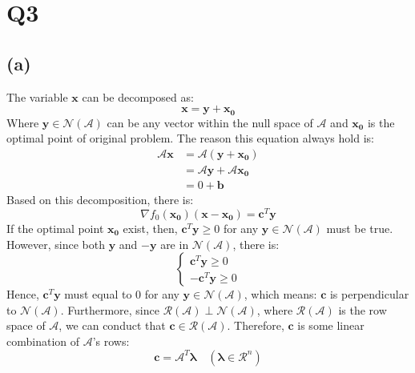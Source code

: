 \documentclass[10pt,a4paper]{article}
\begin{document}
\section*{Q3}

\subsection*{(a)}
The variable $\mathbf{x}$ can be decomposed as:
\begin{equation*}
	\mathbf{x} = \mathbf{y} + \mathbf{x_{0}}
\end{equation*} 
Where $\mathbf{y} \in \mathcal{N}(\mathcal{A})$ can be any vector within the null space of $\mathcal{A}$ and $\mathbf{x_{0}}$ is the optimal point of original problem. The reason this equation always hold is:
\begin{equation}
	\begin{aligned}
		\mathcal{A}\mathbf{x} &= \mathcal{A}(\mathbf{y} + \mathbf{x_{0}}) \\
		&= \mathcal{A}\mathbf{y} + \mathcal{A}\mathbf{x_{0}} \\
		&= 0 + \mathbf{b}
	\end{aligned}
\end{equation}
Based on this decomposition, there is:
\begin{equation}
	\nabla f_{0}(\mathbf{x_{0}})(\mathbf{x} - \mathbf{x_{0}}) = \mathbf{c}^{T}\mathbf{y}
\end{equation}
If the optimal point $\mathbf{x_{0}}$ exist, then, $\mathbf{c}^{T} \mathbf{y} \geq 0$ for any $\mathbf{y} \in \mathcal{N}(\mathcal{A})$ must be true. However, since both $\mathbf{y}$ and $-\mathbf{y}$ are in $\mathcal{N}(\mathcal{A})$, there is:
\begin{equation}
	\begin{cases}
		\mathbf{c}^{T} \mathbf{y} \geq 0 \\
		-\mathbf{c}^{T} \mathbf{y} \geq 0
	\end{cases}
\end{equation}
Hence, $\mathbf{c}^{T} \mathbf{y}$ must equal to 0 for any $\mathbf{y} \in \mathcal{N}(\mathcal{A})$, which means: $\mathbf{c}$ is perpendicular to $\mathcal{N}(\mathcal{A})$. Furthermore, since $\mathcal{R}(\mathcal{A}) \perp \mathcal{N}(\mathcal{A})$, where $\mathcal{R}(\mathcal{A})$ is the row space of $\mathcal{A}$, we can conduct that $\mathbf{c} \in \mathcal{R}(\mathcal{A})$. Therefore, $\mathbf{c}$ is some linear combination of $\mathcal{A}$'s rows:
\begin{equation}
	\mathbf{c} = \mathcal{A}^{T} \mathbf{\lambda} \quad (\mathbf{\lambda} \in \mathcal{R}^{n})
\end{equation}
\end{document}
